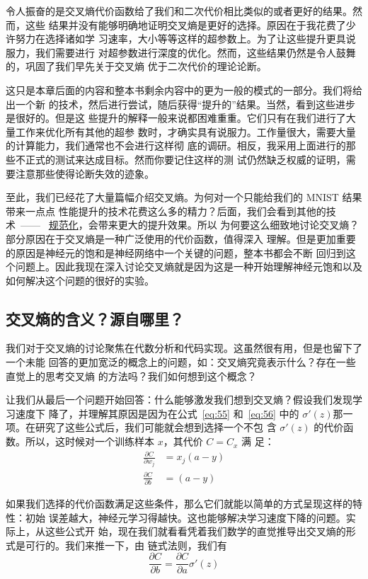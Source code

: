 令人振奋的是交叉熵代价函数给了我们和二次代价相比类似的或者更好的结果。然而，这些
结果并没有能够明确地证明交叉熵是更好的选择。原因在于我花费了少许努力在选择诸如学
习速率，\minibatch{}大小等等这样的超参数上。为了让这些提升更具说服力，我们需要进行
对超参数进行深度的优化。然而，这些结果仍然是令人鼓舞的，巩固了我们早先关于交叉熵
优于二次代价的理论论断。

这只是本章后面的内容和整本书剩余内容中的更为一般的模式的一部分。我们将给出一个新
的技术，然后进行尝试，随后获得“提升的”结果。当然，看到这些进步是很好的。但是这
些提升的解释一般来说都困难重重。它们只有在我们进行了大量工作来优化所有其他的超参
数时，才确实具有说服力。工作量很大，需要大量的计算能力，我们通常也不会进行这样彻
底的调研。相反，我采用上面进行的那些不正式的测试来达成目标。然而你要记住这样的测
试仍然缺乏权威的证明，需要注意那些使得论断失效的迹象。

至此，我们已经花了大量篇幅介绍交叉熵。为何对一个只能给我们的 MNIST 结果带来一点点
性能提升的技术花费这么多的精力？后面，我们会看到其他的技术~——~
\hyperref[sec:overfitting_and_regularization]{规范化}，会带来更大的提升效果。所以
为何要这么细致地讨论交叉熵？部分原因在于交叉熵是一种广泛使用的代价函数，值得深入
理解。但是更加重要的原因是神经元的饱和是神经网络中一个关键的问题，整本书都会不断
回归到这个问题上。因此我现在深入讨论交叉熵就是因为这是一种开始理解神经元饱和以及
如何解决这个问题的很好的实验。

\subsection{交叉熵的含义？源自哪里？}

我们对于交叉熵的讨论聚焦在代数分析和代码实现。这虽然很有用，但是也留下了一个未能
回答的更加宽泛的概念上的问题，如：交叉熵究竟表示什么？存在一些直觉上的思考交叉熵
的方法吗？我们如何想到这个概念？

让我们从最后一个问题开始回答：什么能够激发我们想到交叉熵？假设我们发现学习速度下
降了，并理解其原因是因为在公式~\eqref{eq:55} 和~\eqref{eq:56} 中的
$\sigma'(z)$那一项。在研究了这些公式后，我们可能就会想到选择一个不包
含 $\sigma'(z)$ 的代价函数。所以，这时候对一个训练样本 $x$，其代价 $C = C_x$ 满
足：
\begin{align}
  \frac{\partial C}{\partial w_j} &= x_j(a-y) \label{eq:71}\tag{71}\\
  \frac{\partial C}{\partial b } &= (a-y) \label{eq:72}\tag{72}
\end{align}

如果我们选择的代价函数满足这些条件，那么它们就能以简单的方式呈现这样的特性：初始
误差越大，神经元学习得越快。这也能够解决学习速度下降的问题。实际上，从这些公式开
始，现在我们就看看凭着我们数学的直觉推导出交叉熵的形式是可行的。我们来推一下，由
链式法则，我们有
\begin{equation}
  \frac{\partial C}{\partial b} = \frac{\partial C}{\partial a}
  \sigma'(z)
  \tag{73}
\end{equation}

